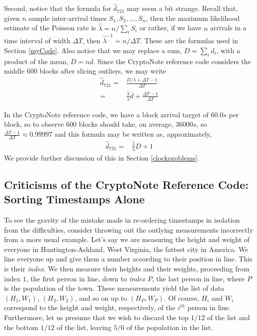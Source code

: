 \documentclass[12pt,english]{mrl}
\theoremstyle{definition}
\numberwithin{equation}{section}
\numberwithin{figure}{section}
\numberwithin{equation}{section}
\numberwithin{equation}{section}
\numberwithin{figure}{section}
\begin{document}
Second, notice that the formula for $\hat{d}_{721}$ may seem a bit strange. Recall that, given $n$ sample inter-arrival times $S_1, S_2, \ldots, S_n$, then the maximum likelihood estimate of the Poisson rate is $\hat{\lambda} = n/\sum_i S_i$ or rather, if we have $n$ arrivals in a time interval of width $\Delta T$, then $\hat{\lambda}^{-1} = n/\Delta T$. These are the formulas used in Section \ref{myCode}. Also notice that we may replace a sum, $D = \sum_i d_i$, with a product of the mean, $D = n\overline{d}$. Since the CryptoNote reference code considers the middle $600$ blocks after slicing outliers, we may write
\begin{align*}
\hat{d}_{721} =&\frac{D/\lambda + \Delta T - 1}{\Delta T}\\
=& \frac{\hat{\lambda}}{\lambda} \overline{d} + \frac{\Delta T - 1}{\Delta T}
\end{align*}


In the CryptoNote reference code, we have a block arrival target of $60.0 s$ per block, so to observe $600$ blocks should take, on average, $36000 s$, so $\frac{\Delta T - 1}{\Delta T} \approx 0.99997$ and this formula may be written as, approximately,
\begin{align}
\hat{d}_{721} =&  \frac{\hat{\lambda}}{\lambda} D + 1 \label{diffFormApprox}
\end{align}
We provide further discussion of this in Section \ref{clockproblems}.

\subsection{Criticisms of the CryptoNote Reference Code: Sorting Timestamps Alone}\label{reorderingproblems}

To see the gravity of the mistake made in re-ordering timestamps in isolation from the difficulties, consider throwing out the outlying measurements incorrectly from a more usual example. Let's say we are measuring the height and weight of everyone in Huntington-Ashland, West Virginia, the fattest city in America. We line everyone up and give them a number according to their position in line. This is their \emph{index}. We then measure their heights and their weights, proceeding from index $1$, the first person in line, down to \emph{index} $P$, the last person in line, where $P$ is the population of the town. These measurements yield the list of data $(H_1, W_1)$, $(H_2, W_2)$, and so on up to $(H_P, W_P)$. Of course, $H_i$ and $W_i$ correspond to the height and weight, respectively, of the $i^{th}$ person in line. Furthermore, let us presume that we wish to discard the top $1/12$ of the list and the bottom $1/12$ of the list, leaving $5/6$ of the population in the list. 
\end{document}
